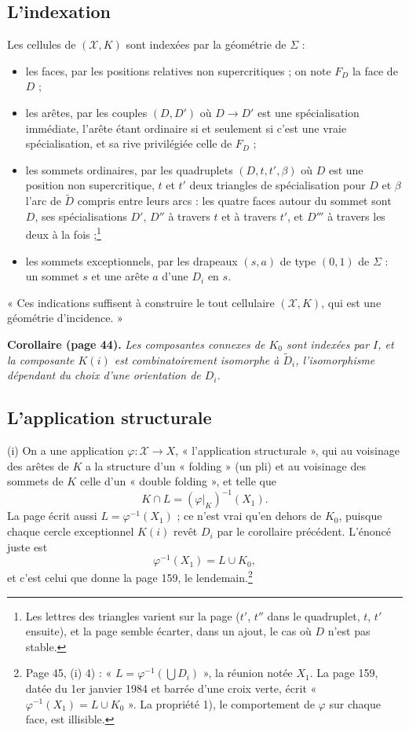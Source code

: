 \documentclass[11pt,a4paper]{article}
\begin{document}
\subsection*{L'indexation}

Les cellules de $(\mathcal{X}, K)$ sont indexées par la géométrie de
$\Sigma$ :
\begin{itemize}
\item les faces, par les positions relatives non supercritiques ; on note $F_D$
la face de $D$ ;
\item les arêtes, par les couples $(D, D')$ où $D \to D'$ est une spécialisation
immédiate, l'arête étant ordinaire si et seulement si c'est une vraie
spécialisation, et sa rive privilégiée celle de $F_D$ ;
\item les sommets ordinaires, par les quadruplets $(D, t, t', \beta)$ où $D$ est
une position non supercritique, $t$ et $t'$ deux triangles de spécialisation
pour $D$ et $\beta$ l'arc de $\widetilde{D}$ compris entre leurs arcs : les
quatre faces autour du sommet sont $D$, ses spécialisations $D'$, $D''$ à
travers $t$ et à travers $t'$, et $D'''$ à travers les deux à la
fois ;\footnote{Les lettres des triangles varient sur la page ($t'$, $t''$ dans
le quadruplet, $t$, $t'$ ensuite), et la page semble écarter, dans un ajout,
le cas où $D$ n'est pas stable.}
\item les sommets exceptionnels, par les drapeaux $(s, a)$ de type $(0, 1)$ de
$\Sigma$ : un sommet $s$ et une arête $a$ d'une $D_i$ en $s$.
\end{itemize}
« Ces indications suffisent à construire le tout cellulaire $(\mathcal{X}, K)$,
qui est une géométrie d'incidence. »

\textbf{Corollaire (page 44).} \emph{Les composantes connexes de $K_0$ sont
indexées par $I$, et la composante $K(i)$ est combinatoirement isomorphe à
$\widetilde{D}_i$, l'isomorphisme dépendant du choix d'une orientation de
$D_i$.}

\subsection*{L'application structurale}

(i) On a une application $\varphi : \mathcal{X} \to X$, « l'application
structurale », qui au voisinage des arêtes de $K$ a la structure d'un
« folding » (un pli) et au voisinage des sommets de $K$ celle d'un « double
folding », et telle que
\[
K \cap L = (\varphi|_K)^{-1}(X_1) .
\]
La page écrit aussi $L = \varphi^{-1}(X_1)$ ; ce n'est vrai qu'en dehors de
$K_0$, puisque chaque cercle exceptionnel $K(i)$ revêt $D_i$ par le corollaire
précédent. L'énoncé juste est
\[
\varphi^{-1}(X_1) = L \cup K_0 ,
\]
et c'est celui que donne la page 159, le lendemain.\footnote{Page 45, (i) 4) :
« $L = \varphi^{-1}(\bigcup D_i)$ », la réunion notée $X_1$. La page 159, datée
du 1er janvier 1984 et barrée d'une croix verte, écrit
« $\varphi^{-1}(X_1) = L \cup K_0$ ». La propriété 1), le comportement de
$\varphi$ sur chaque face, est illisible.}
\end{document}
